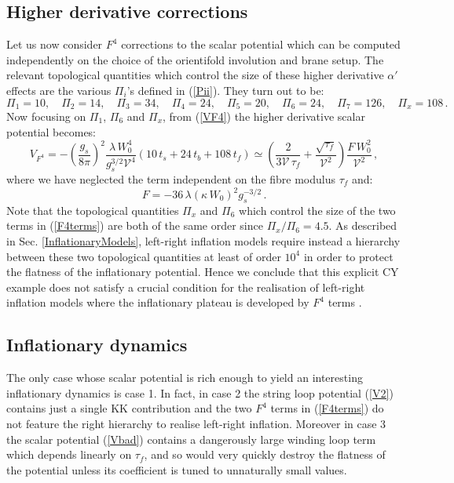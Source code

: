 \documentclass[11pt,a4paper]{article}
\newcommand{\be}{\begin{equation}}
\newcommand{\ee}{\end{equation}}
\newcommand\vo{{\mathcal{V}}}
\begin{document}
\subsection{Higher derivative corrections}

Let us now consider $F^4$ corrections to the scalar potential which can be computed independently on the choice of the orientifold involution and brane setup. The relevant topological quantities which control the size of these higher derivative $\alpha'$ effects are the various $\Pi_i$'s defined in (\ref{Pii}). They turn out to be:
\be
\Pi_1 =10 , \quad \Pi_2 = 14 , \quad \Pi_3 =34 , \quad \Pi_4 =24 , \quad \Pi_5 =20 ,\quad  \Pi_6 =24 ,  \quad   \Pi_7 =126 , \quad \Pi_x = 108\,. \nonumber
\ee
Now focusing on $\Pi_1$, $\Pi_6$ and $\Pi_x$, from (\ref{VF4}) the higher derivative scalar potential becomes:
\be
V_{F^4} = - \left(\frac{g_s}{8\pi}\right)^2 \frac{\lambda\, W_0^4}{g_s^{3/2}\vo^4} \left(10 \,t_s + 24 \,t_b + 108\, t_f\right)
\simeq \left(\frac{2}{3\vo\,\tau_f}+\frac{\sqrt{\tau_f}}{\vo^2} \right) \frac{F\,W_0^2}{\vo^2}\,,
\label{F4terms}
\ee
where we have neglected the term independent on the fibre modulus $\tau_f$ and: 
\be
F = -36 \,\lambda \left(\kappa\, W_0\right)^2 g_s^{-3/2}\,.
\ee
Note that the topological quantities $\Pi_x$ and $\Pi_6$ which control the size of the two terms in (\ref{F4terms}) are both of the same order since $\Pi_x/\Pi_6=4.5$. As described in Sec. \ref{InflationaryModels}, left-right inflation models require instead a hierarchy between these two topological quantities at least of order $10^4$ in order to protect the flatness of the inflationary potential. Hence we conclude that this explicit CY example does not satisfy a crucial condition for the realisation of left-right inflation models where the inflationary plateau is developed by $F^4$ terms \cite{Broy:2015zba}. 

\subsection{Inflationary dynamics}

The only case whose scalar potential is rich enough to yield an interesting inflationary dynamics is case 1. In fact, in case 2 the string loop potential (\ref{V2}) contains just a single KK contribution and the two $F^4$ terms in (\ref{F4terms}) do not feature the right hierarchy to realise left-right inflation. Moreover in case 3 the scalar potential (\ref{Vbad}) contains a dangerously large winding loop term which depends linearly on $\tau_f$, and so would very quickly destroy the flatness of the potential unless its coefficient is tuned to unnaturally small values. 
\end{document}
